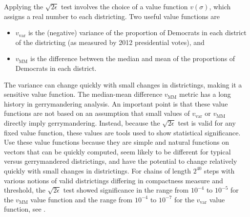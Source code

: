 \documentclass[12pt]{article}
\begin{document}
Applying the \( \sqrt{2\epsilon} \) test involves the choice of a value
function \( v(\sigma) \), which assigns a real number to each
districting.  Two useful value functions are
\begin{itemize}
    \item
        \( v_{\text{var}} \) is the (negative) variance of the
        proportion of Democrats in each district of the districting (as
        measured by 2012 presidential votes), and
    \item
        \( v_{\text{MM}} \) is the difference between the median and
        mean of the proportions of Democrats in each district.
\end{itemize}
The variance can change quickly with small changes in districtings,
making it a sensitive value function.  The median-mean difference \( v_{\text
{MM}} \) metric has a long history in gerrymandering analysis. An
important point is that these value functions are not based on an
assumption that small values of \( v_{\text {var}} \) or \( v_{\text{MM}}
\) directly imply gerrymandering.  Instead, because the \( \sqrt{2\epsilon}
\) test is valid for any fixed value function, these values are tools
used to show statistical significance.  Use these value functions
because they are simple and natural functions on vectors that can be
quickly computed, seem likely to be different for typical versus
gerrymandered districtings, and have the potential to change relatively
quickly with small changes in districtings.  For chains of length \( 2^{40}
\) steps with various notions of valid districtings differing in
compactness measure and threshold, the \( \sqrt{2\epsilon} \) test
showed significance in the range from \( 10^{-4} \) to \( 10^ {-5} \)
for the \( v_{\text {MM}} \) value function and the range from \( 10^{-4}
\) to \( 10^{-7} \) for the \( v_{\text{var}} \) value function, see
\cite{chikina2860si}.
\end{document}
